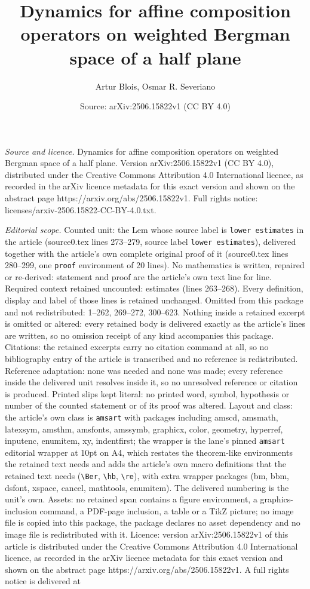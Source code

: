 \documentclass[10pt,a4paper]{amsart}
\title[Dynamics for affine composition operators on weighted Bergma]{Dynamics for affine composition operators on weighted Bergman space of a half plane}
\author{Artur Blois, Osmar R. Severiano}
\date{Source: arXiv:2506.15822v1 (CC BY 4.0)}
\begin{document}
\maketitle

\noindent\emph{Source and licence.} Dynamics for affine composition operators on weighted Bergman space of a half plane. Version arXiv:2506.15822v1 (CC BY 4.0), distributed under the Creative Commons Attribution 4.0 International licence, as recorded in the arXiv licence metadata for this exact version and shown on the abstract page https://arxiv.org/abs/2506.15822v1. Full rights notice: licenses/arxiv-2506.15822-CC-BY-4.0.txt.\par\smallskip

\noindent\textit{Editorial scope.} Counted unit: the Lem whose source label is \texttt{lower estimates} in the article (source0.tex lines 273--279, source label \texttt{lower estimates}), delivered together with the article's own complete original proof of it (source0.tex lines 280--299, one \texttt{proof} environment of 20 lines). No mathematics is written, repaired or re-derived: statement and proof are the article's own text line for line. Required context retained uncounted: estimates (lines 263--268). Every definition, display and label of those lines is retained unchanged. Omitted from this package and not redistributed: 1--262, 269--272, 300--623. Nothing inside a retained excerpt is omitted or altered: every retained body is delivered exactly as the article's lines are written, so no omission receipt of any kind accompanies this package. Citations: the retained excerpts carry no citation command at all, so no bibliography entry of the article is transcribed and no reference is redistributed. Reference adaptation: none was needed and none was made; every reference inside the delivered unit resolves inside it, so no unresolved reference or citation is produced. Printed slips kept literal: no printed word, symbol, hypothesis or number of the counted statement or of its proof was altered. Layout and class: the article's own class is \texttt{amsart} with packages including amscd, amsmath, latexsym, amsthm, amsfonts, amssymb, graphicx, color, geometry, hyperref, inputenc, enumitem, xy, indentfirst; the wrapper is the lane's pinned \texttt{amsart} editorial wrapper at 10pt on A4, which restates the theorem-like environments the retained text needs and adds the article's own macro definitions that the retained text needs (\texttt{\textbackslash Ber}, \texttt{\textbackslash hb}, \texttt{\textbackslash re}), with extra wrapper packages (bm, bbm, dsfont, xspace, cancel, mathtools, enumitem). The delivered numbering is the unit's own. Assets: no retained span contains a figure environment, a graphics-inclusion command, a PDF-page inclusion, a table or a TikZ picture; no image file is copied into this package, the package declares no asset dependency and no image file is redistributed with it. Licence: version arXiv:2506.15822v1 of this article is distributed under the Creative Commons Attribution 4.0 International licence, as recorded in the arXiv licence metadata for this exact version and shown on the abstract page https://arxiv.org/abs/2506.15822v1. A full rights notice is delivered at 
\end{document}
